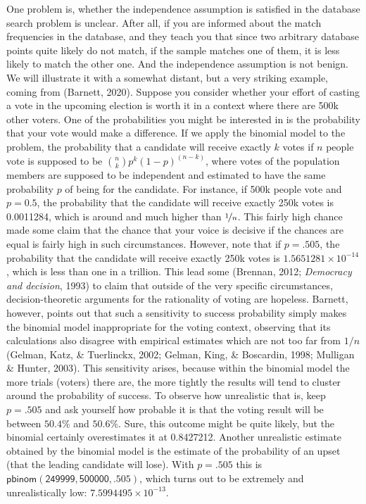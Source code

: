 \documentclass[
  10pt,
  dvipsnames,enabledeprecatedfontcommands]{scrartcl}
\begin{document}
One problem is, whether the independence assumption is satisfied in the
database search problem is unclear. After all, if you are informed about
the match frequencies in the database, and they teach you that since two
arbitrary database points quite likely do not match, if the sample
matches one of them, it is less likely to match the other one. And the
independence assumption is not benign. We will illustrate it with a
somewhat distant, but a very striking example, coming from (Barnett,
2020). Suppose you consider whether your effort of casting a vote in the
upcoming election is worth it in a context where there are 500k other
voters. One of the probabilities you might be interested in is the
probability that your vote would make a difference. If we apply the
binomial model to the problem, the probability that a candidate will
receive exactly \(k\) votes if \(n\) people vote is supposed to be
\({n \choose k} p^{k} (1-p)^{(n-k)}\), where votes of the population
members are supposed to be independent and estimated to have the same
probability \(p\) of being for the candidate. For instance, if 500k
people vote and \(p= 0.5\), the probability that the candidate will
receive exactly 250k votes is 0.0011284, which is around
 and much higher than \(\nicefrac{1}{n}\). This fairly
high chance made some claim that the chance that your voice is decisive
if the chances are equal is fairly high in such circumstances. However,
note that if \(p=.505\), the probability that the candidate will receive
exactly 250k votes is \ensuremath{1.5651281\times 10^{-14}}, which is
less than one in a trillion. This lead some (Brennan, 2012;
\emph{Democracy and decision}, 1993) to claim that outside of the very
specific circumstances, decision-theoretic arguments for the rationality
of voting are hopeless. Barnett, however, points out that such a
sensitivity to success probability simply makes the binomial model
inappropriate for the voting context, observing that its calculations
also disagree with empirical estimates which are not too far from
\(1/n\) (Gelman, Katz, \& Tuerlinckx, 2002; Gelman, King, \& Boscardin,
1998; Mulligan \& Hunter, 2003). This sensitivity arises, because within
the binomial model the more trials (voters) there are, the more tightly
the results will tend to cluster around the probability of success. To
observe how unrealistic that is, keep \(p=.505\) and ask yourself how
probable it is that the voting result will be between \(50.4\%\) and
\(50.6\%\). Sure, this outcome might be quite likely, but the binomial
certainly overestimates it at 0.8427212. Another unrealistic estimate
obtained by the binomial model is the estimate of the probability of an
upset (that the leading candidate will lose). With \(p=.505\) this is
\(\mathsf{pbinom(249999,500000,.505)}\), which turns out to be extremely
and unrealistically low: \ensuremath{7.5994495\times 10^{-13}}.
\end{document}
